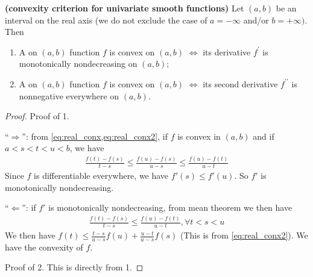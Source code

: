 \documentclass{article}
\newcommand{\bfs}[1]{\textbf{({#1}) }}
\begin{document}
\begin{thma}{\bfs{convexity criterion for univariate smooth functions}}\label{thm:ccusf}
Let $(a, b)$ be an interval on the real axis (we do not exclude the case of $a=-\infty$ and/or $b=+\infty)$. Then
\begin{enumerate}
    \item A  on $(a, b)$ function $f$ is convex on $(a, b)$ $\Longleftrightarrow$ its derivative $f^{\prime}$ is monotonically nondecreasing on $(a, b) ;$
    \item A  on $(a, b)$ function $f$ is convex on $(a, b)$ $\Longleftrightarrow$ its second derivative $f^{\prime \prime}$ is nonnegative everywhere on $(a, b)$.
\end{enumerate}
\end{thma} 
\begin{proof}\color{ForestGreen}
Proof of 1.

``$\Rightarrow$'': from \cref{eq:real_conx,eq:real_conx2}, if $f$ is convex in $(a, b)$ and if $a<s<t<u<b$,  we have 
\begin{align}
\frac{f(t)-f(s)}{t-s} \leq \frac{f(u)-f(s)}{u-s} \leq \frac{f(u)-f(t)}{u-t}\label{eq:real_c3}
\end{align}
Since $f$ is differentiable everywhere, we have $f'(s)\le f'(u)$. So $f'$ is monotonically nondecreasing.

``$\Leftarrow$'': if  $f'$ is monotonically nondecreasing, from mean theorem we then have 
\begin{align}
\frac{f(t)-f(s)}{t-s}  \leq \frac{f(u)-f(t)}{u-t},\forall t<s<u
\end{align}
We then have $f(t)\le \frac{t-s}{u-s}f(u)+\frac{u-t}{u-s}f(s)$ (This is from \cref{eq:real_conx2}). We have the convexity of $f$.

Proof of 2. This is directly from 1.
\end{proof}
\end{document}

